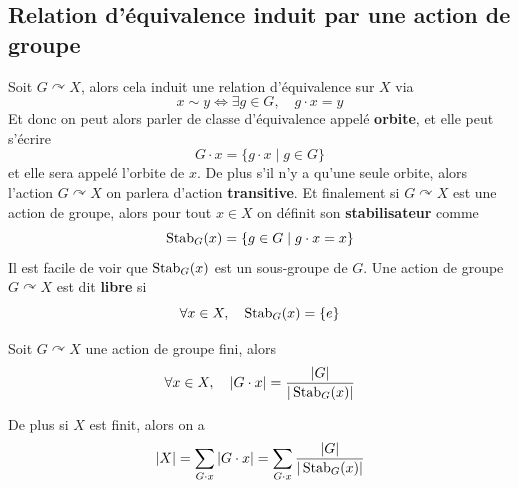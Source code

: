 \subsection{Relation d'équivalence induit par une action de groupe}
\begin{definition}
	Soit $G \curvearrowright X$, alors cela induit une relation d'équivalence sur $X$ via
	\[
	x \sim y \iff \exists g \in G, \quad g \cdot x = y
	\]
	Et donc on peut alors parler de classe d'équivalence appelé \textbf{orbite}, et elle peut s'écrire
	\[
	G \cdot x = \{g \cdot x \mid g \in G\}
	\]
	et elle sera appelé l'orbite de $x$. De plus s'il n'y a qu'une seule orbite, alors l'action $G \curvearrowright X$ on parlera d'action \textbf{transitive}. Et finalement si $G \curvearrowright X$ est une action de groupe, alors pour tout $x \in X$ on définit son \textbf{stabilisateur} comme 
	\[
	\operatorname{Stab}_G(x) = \{g \in G \mid g \cdot x = x\}
	\]
	Il est facile de voir que $\operatorname{Stab}_G(x)$ est un sous-groupe de $G$. Une action de groupe $G \curvearrowright X$ est dit \textbf{libre} si
	\[
	\forall x \in X, \quad \operatorname{Stab}_G(x) = \{e\}
	\]
\end{definition}

\begin{theoreme} \label{thm: théorème de l'orbite-stabilisateur}
	Soit $G \curvearrowright X$ une action de groupe fini, alors
	\[
	\forall x \in X, \quad |G \cdot x| = \frac{|G|}{|\operatorname{Stab}_G(x)|}
	\]
\end{theoreme}


\begin{remarque} \label{rmq: théorème de l'orbite-stabilisateur}
	De plus si $X$ est finit, alors on a
	\[
	|X| = \sum_{G \cdot x} |G \cdot x| = \sum_{G \cdot x} \frac{|G|}{|\operatorname{Stab}_G(x)|}
	\]
\end{remarque}

